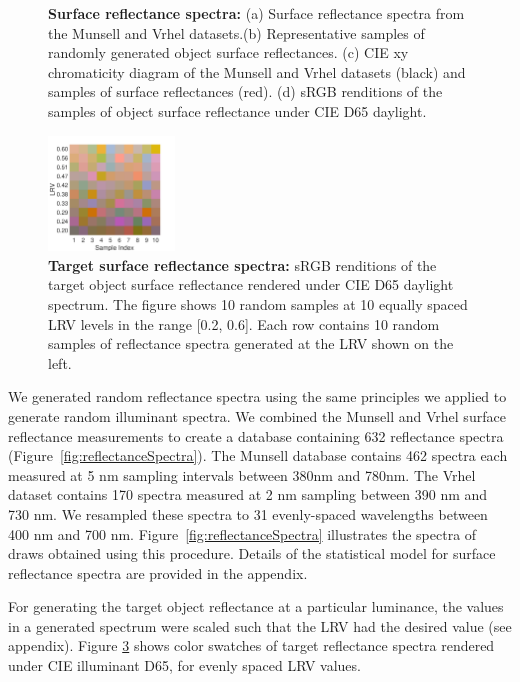 \documentclass{jov}
\begin{document}
\begin{figure}
\begin{subfigure}{0.24 \textwidth}
        \label{fig:backgroundSwatches}
    \end{subfigure}
    \caption{{\bf Surface reflectance spectra:} (a) Surface reflectance spectra from the Munsell and Vrhel datasets.(b) Representative samples of randomly generated object surface reflectances. (c) CIE xy chromaticity diagram of the Munsell and Vrhel datasets (black) and samples of surface reflectances (red). (d) sRGB renditions of the samples of object surface reflectance under CIE D65 daylight.}
\label{fig:surfaceReflectanceGeneration}
\end{figure}

\begin{figure}
\centering
\includegraphics[width=0.3\textwidth]{../FiguresDraft4/Figure8/Figure8.pdf}
\caption{{\bf Target surface reflectance spectra:} sRGB renditions of the target object surface reflectance rendered under CIE D65 daylight spectrum. The figure shows 10 random samples at 10 equally spaced LRV levels in the range [0.2, 0.6]. Each row contains 10 random samples of reflectance spectra generated at the LRV shown on the left.}
\label{fig:targetSwatches}
\end{figure}

We generated random reflectance spectra using the same principles we applied to generate random illuminant spectra.
We combined the Munsell \cite{kelly1943tristimulus} and Vrhel \cite{vrhel1994measurement} surface reflectance 
measurements to create a database containing 632 reflectance spectra (Figure~\ref{fig:reflectanceSpectra}).
The Munsell database contains 462 spectra each measured at 5 nm sampling intervals between 380nm and 780nm.
The Vrhel dataset contains 170 spectra measured at 2 nm sampling between 390 nm and 730 nm.
We resampled these spectra to 31 evenly-spaced wavelengths between 400 nm and 700 nm.
Figure~\ref{fig:reflectanceSpectra} illustrates the spectra of draws obtained using this procedure.
Details of the statistical model for surface reflectance spectra are provided in the appendix. 

For generating the target object reflectance at a particular luminance, the values in a generated spectrum were 
scaled such that the LRV had the desired value (see appendix).
Figure \ref{fig:targetSwatches} shows color swatches of target reflectance spectra rendered under CIE illuminant D65, for evenly spaced LRV values.
\end{document}
